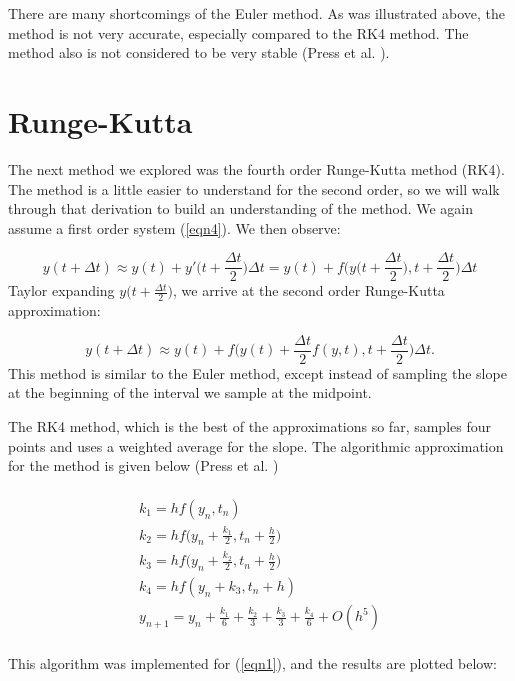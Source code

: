 \documentclass{article}
\begin{document}
There are many shortcomings of the Euler method. As was illustrated above, the method is not very accurate, especially compared to the RK4 method. The method also is not considered to be very stable (Press et al. \cite{Press}).

\section{Runge-Kutta}
The next method we explored was the fourth order Runge-Kutta method (RK4). The method is a little easier to understand for the second order, so we will walk through that derivation to build an understanding of the method. We again assume a first order system (\ref{eqn4}). We then observe:

\begin{equation}
y(t+\Delta t) \approx y(t)+ y'\Big(t+\frac{\Delta t}{2}\Big) \Delta t = y(t)+f\Big(y\Big(t+\frac{\Delta t}{2}\Big),t+\frac{\Delta t}{2}\Big)\Delta t
\label{eqn8}
\end{equation}
Taylor expanding $y\Big(t+\frac{\Delta t}{2}\Big)$, we arrive at the second order Runge-Kutta approximation:

\begin{equation}
y(t+\Delta t) \approx y(t)+ f\Big(y(t)+\frac{\Delta t}{2} f(y,t), t+\frac{\Delta t}{2}\Big)\Delta t.
\label{eqn9}
\end{equation}
This method is similar to the Euler method, except instead of sampling the slope at the beginning of the interval we sample at the midpoint.

The RK4 method, which is the best of the approximations so far, samples four points and uses a weighted average for the slope. The algorithmic approximation for the method is given below (Press et al. \cite{Press})

\begin{multline}
\\k_1= h f(y_n, t_n)\\
k_2 = h f\Big(y_n+\frac{k_1}{2},t_n+\frac{h}{2}\Big)\\
k_3 = h f\Big(y_n+\frac{k_2}{2},t_n+\frac{h}{2}\Big)\\
k_4 = h f(y_n+k_3,t_n+h)\\
y_{n+1} = y_n+\frac{k_1}{6}+\frac{k_2}{3}+\frac{k_3}{3}+\frac{k_4}{6}+O(h^5)\\
\label{eqn9}
\end{multline}

This algorithm was implemented for (\ref{eqn1}), and the results are plotted below:
\end{document}
